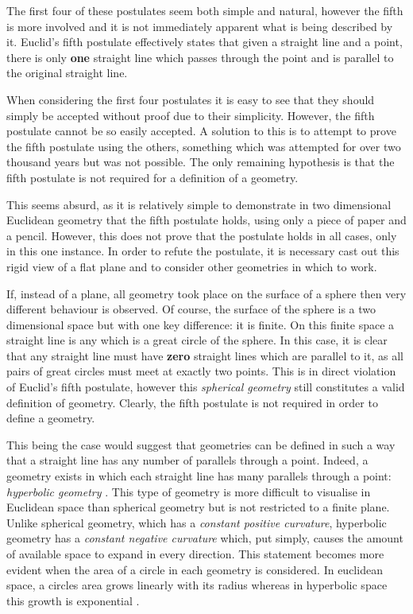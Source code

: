 The first four of these postulates seem both simple and natural, however the fifth is more involved and it is not immediately apparent what is being described by it. Euclid's fifth postulate effectively states that given a straight line and a point, there is only \textbf{one} straight line which passes through the point and is parallel to the original straight line. 

When considering the first four postulates it is easy to see that they should simply be accepted without proof due to their simplicity. However, the fifth postulate cannot be so easily accepted. A solution to this is to attempt to prove the fifth postulate using the others, something which was attempted for over two thousand years \cite{ratcliffe_foundations_2006} but was not possible. The only remaining hypothesis is that the fifth postulate is not required for a definition of a geometry.

This seems absurd, as it is relatively simple to demonstrate in two dimensional Euclidean geometry that the fifth postulate holds, using only a piece of paper and a pencil. However, this does not prove that the postulate holds in all cases, only in this one instance. In order to refute the postulate, it is necessary cast out this rigid view of a flat plane and to consider other geometries in which to work. 

If, instead of a plane, all geometry took place on the surface of a sphere then very different behaviour is observed. Of course, the surface of the sphere is a two dimensional space but with one key difference: it is finite. On this finite space a straight line is any which is a great circle of the sphere. In this case, it is clear that any straight line must have \textbf{zero} straight lines which are parallel to it, as all pairs of great circles must meet at exactly two points. This is in direct violation of Euclid's fifth postulate, however this \textit{spherical geometry} still constitutes a valid definition of geometry. Clearly, the fifth postulate is not required in order to define a geometry.

This being the case would suggest that geometries can be defined in such a way that a straight line has any number of parallels through a point. Indeed, a geometry exists in which each straight line has many parallels through a point: \textit{hyperbolic geometry} \cite{munzner_visualizing_1995}. This type of geometry is more difficult to visualise in Euclidean space than spherical geometry but is not restricted to a finite plane. Unlike spherical geometry, which has a \textit{constant positive curvature}, hyperbolic geometry has a \textit{constant negative curvature} which, put simply, causes the amount of available space to expand in every direction. This statement becomes more evident when the area of a circle in each geometry is considered. In euclidean space, a circles area grows linearly with its radius whereas in hyperbolic space this growth is exponential \cite{munzner_visualizing_1995}.

